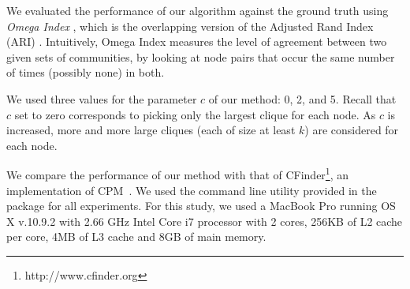 %
%
%
%
%
%

We evaluated the performance of our algorithm against the ground truth 
using {\it Omega Index} \cite{doi:10.1207/s15327906mbr2302_6}, 
which is the overlapping version of the Adjusted Rand Index (ARI) \cite{ARI_paper_1985}.
Intuitively, Omega Index measures the level of agreement between two given sets of communities, by looking at node pairs that occur the same number of times (possibly none) in both.

We used three values for the parameter $c$ of our method: 0, 2, and 5. 
Recall that $c$ set to zero corresponds to picking only the largest clique for each node. 
As $c$ is increased, more and more large cliques (each of size at least $k$)
are considered for each node. 

We compare the performance of our method with that of CFinder\footnote{http://www.cfinder.org}, an implementation of CPM~\cite{cite-key}. We used the command line utility provided in the package for all experiments. For this study, we used a MacBook Pro running OS X v.10.9.2 with 2.66 GHz Intel Core i7 processor with 2 cores, 256KB of L2 cache per core, 4MB of L3 cache and 8GB of main memory.

